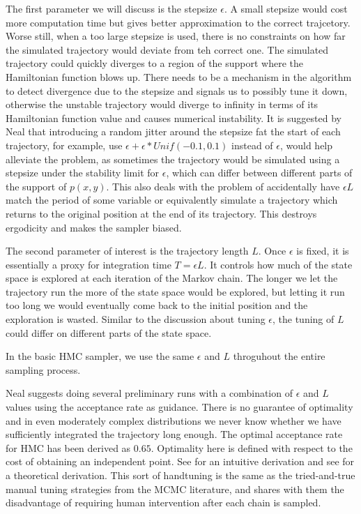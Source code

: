 \documentclass{book}
\begin{document}
\begin{enumerate}
The first parameter we will discuss is the stepsize $\epsilon$. A small stepsize would cost more computation time but gives better approximation to the correct trajcetory. Worse still, when a too large stepsize is used, there is no constraints on how far the simulated trajectory would deviate from teh correct one. The simulated trajectory could quickly diverges to a region of the support where the Hamiltonian function blows up. There needs to be a mechanism in the algorithm to detect divergence due to the stepsize and signals us to possibly tune it down, otherwise the unstable trajectory would diverge to infinity in terms of its Hamiltonian function value and causes numerical instability. It is suggested by Neal that introducing a random jitter around the stepsize fat the start of each trajectory, for example, use $\epsilon + \epsilon*Unif(-0.1,0.1)$ instead of $\epsilon$,  would help alleviate the problem, as sometimes the trajectory would be simulated using a stepsize under the stability limit for $\epsilon$, which can differ between different parts of the support of $p(x,y)$. This also deals with the problem of accidentally have $\epsilon L$ match the period of some variable or equivalently simulate a trajectory which returns to the original position at the end of its trajectory. This destroys ergodicity and makes the sampler biased.

The second parameter of interest is the trajectory length $L$. Once $\epsilon$ is fixed, it is essentially a proxy for integration time $T= \epsilon L$. It controls how much of the state space is explored at each iteration of the Markov chain. The longer we let the trajectory run the more of the state space would be explored, but letting it run too long we would eventually come back to the initial position and the exploration is wasted. Similar to the discussion about tuning $\epsilon$, the tuning of $L$ could differ on different parts of the state space. 

In the basic HMC sampler, we use the same $\epsilon$ and $L$ throguhout the
entire sampling process.  

Neal suggests doing several preliminary runs with a combination of $\epsilon$ and $L$ values using the acceptance rate as guidance. There is no guarantee of optimality and in even moderately complex distributions we never know whether we have sufficiently integrated the trajectory long enough. The optimal acceptance rate for HMC has been derived as $0.65$. Optimality here is defined with respect to the cost of obtaining an independent point. See \cite{neal2011mcmc} for an intuitive derivation and see \cite{beskos2013optimal} for a theoretical derivation. This sort of handtuning is the same as the tried-and-true manual tuning strategies from the MCMC literature, and shares with them the disadvantage of requiring human intervention after each chain is sampled. 


\end{enumerate}
\end{document}
